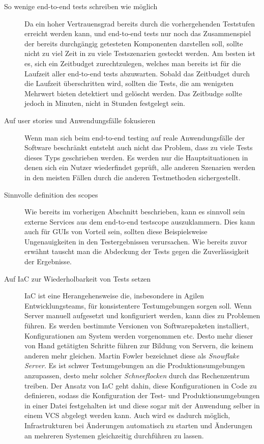 \documentclass[12pt,a4paper,bibliography=totocnumbered,listof=totocnumbered]{scrartcl}
\begin{document}
\begin{description}
	\item[So wenige end-to-end tests schreiben wie möglich] Da ein hoher Vertrauensgrad bereits durch die vorhergehenden Teststufen erreicht werden kann, und end-to-end tests nur noch das Zusammenspiel der bereits durchgängig getesteten Komponenten darstellen soll, sollte nicht zu viel Zeit in zu viele Testszenarien gesteckt werden. Am besten ist es, sich ein Zeitbudget zurechtzulegen, welches man bereits ist für die Laufzeit aller end-to-end tests abzuwarten. Sobald das Zeitbudget durch die Laufzeit überschritten wird, sollten die Tests, die am wenigsten Mehrwert bieten detektiert und gelöscht werden. Das Zeitbudge sollte jedoch in Minuten, nicht in Stunden festgelegt sein.\cite{clemson}	
	
	\item[Auf user stories und Anwendungsfälle fokusieren] Wenn man sich beim end-to-end testing auf reale Anwendungsfälle der Software beschränkt entsteht auch nicht das Problem, dass zu viele Tests dieses Typs geschrieben werden. Es werden nur die Hauptsituationen in denen sich ein Nutzer wiederfindet geprüft, alle anderen Szenarien werden in den meisten Fällen durch die anderen Testmethoden sichergestellt.\cite{clemson}
	
	\item[Sinnvolle definition des scopes] Wie bereits im vorherigen Abschnitt beschrieben, kann es sinnvoll sein externe Services aus dem end-to-end testscope auszuklammern. Dies kann auch für \acsp{GUI} von Vorteil sein, sollten diese Beispielsweise Ungenauigkeiten in den Testergebnissen verursachen. Wie bereits zuvor erwähnt tauscht man die Abdeckung der Tests gegen die Zuverlässigkeit der Ergebnisse.\cite{clemson}
	
	\item[Auf \ac{IaC} zur Wiederholbarkeit von Tests setzen] \ac{IaC} ist eine Herangehensweise die, insbesondere in Agilen Entwicklungsteams, für konsistentere Testumgebungen sorgen soll. Wenn Server manuell aufgesetzt und konfiguriert werden, kann dies zu Problemen führen. Es werden bestimmte Versionen von Softwarepaketen installiert, Konfigurationen am System werden vorgenommen etc. Desto mehr dieser von Hand getätigten Schritte führen zur Bildung von Servern, die keinem anderen mehr gleichen. Martin  Fowler bezeichnet diese als \textit{Snowflake Server}\cite{fowlersnow}. Es ist schwer Testumgebungen an die Produktionsumgebungen anzupassen, desto mehr solcher \textit{Schneeflocken} durch das Rechenzentrum treiben. Der Ansatz von \ac{IaC} geht dahin, diese Konfigurationen in Code zu definieren, sodass die Konfiguration der Test- und Produktionsumgebungen in einer Datei festgehalten ist und diese sogar mit der Anwendung selber in einem \acs{VCS} abgelegt werden kann. Auch wird es dadurch möglich, Infrastrukturen bei Änderungen automatisch zu starten und Änderungen an mehreren Systemen gleichzeitig durchführen zu lassen.\cite{fowlersnow}
	

\end{description}
\end{document}
